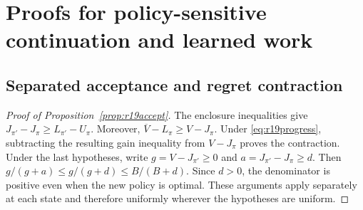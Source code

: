 \section{Proofs for policy-sensitive continuation and learned work}\label{app:r19proofs}
\subsection{Separated acceptance and regret contraction}
\begin{proof}[Proof of Proposition~\ref{prop:r19accept}]
The enclosure inequalities give $J_{\pi'}-J_\pi\geq L_{\pi'}-U_\pi$. Moreover, $\overline V-L_\pi\geq V-J_\pi$. Under \eqref{eq:r19progress}, subtracting the resulting gain inequality from $V-J_\pi$ proves the contraction. Under the last hypotheses, write $g=V-J_{\pi'}\geq0$ and $a=J_{\pi'}-J_\pi\geq d$. Then $g/(g+a)\leq g/(g+d)\leq B/(B+d)$. Since $d>0$, the denominator is positive even when the new policy is optimal. These arguments apply separately at each state and therefore uniformly wherever the hypotheses are uniform.
\end{proof}

